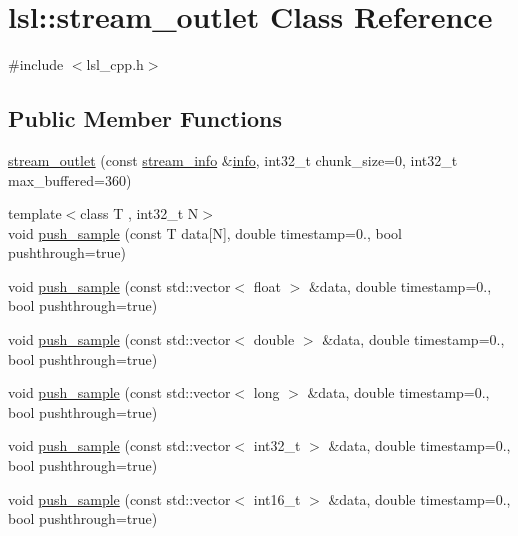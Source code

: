 \hypertarget{classlsl_1_1stream__outlet}{}\section{lsl\+:\+:stream\+\_\+outlet Class Reference}
\label{classlsl_1_1stream__outlet}


{\ttfamily \#include $<$lsl\+\_\+cpp.\+h$>$}

\subsection*{Public Member Functions}
\begin{DoxyCompactItemize}
\item 
\hyperlink{classlsl_1_1stream__outlet_ac88c568fdc7429d95c51cd7b58d902cc}{stream\+\_\+outlet} (const \hyperlink{classlsl_1_1stream__info}{stream\+\_\+info} \&\hyperlink{classlsl_1_1stream__outlet_af6fda8eb922b27ae3ed98651934243fe}{info}, int32\+\_\+t chunk\+\_\+size=0, int32\+\_\+t max\+\_\+buffered=360)
\item 
{\footnotesize template$<$class T , int32\+\_\+t N$>$ }\\void \hyperlink{classlsl_1_1stream__outlet_a675bbe044a5053087e05e0267fe6722a}{push\+\_\+sample} (const T data\mbox{[}N\mbox{]}, double timestamp=0., bool pushthrough=true)
\item 
void \hyperlink{classlsl_1_1stream__outlet_a4c984d8bf178e2321c590aaf81d4da3f}{push\+\_\+sample} (const std\+::vector$<$ float $>$ \&data, double timestamp=0., bool pushthrough=true)
\item 
void \hyperlink{classlsl_1_1stream__outlet_abd59227041d01d48e90d4d5d05da7662}{push\+\_\+sample} (const std\+::vector$<$ double $>$ \&data, double timestamp=0., bool pushthrough=true)
\item 
void \hyperlink{classlsl_1_1stream__outlet_a277f76e889a33849170d5c25fa99c723}{push\+\_\+sample} (const std\+::vector$<$ long $>$ \&data, double timestamp=0., bool pushthrough=true)
\item 
void \hyperlink{classlsl_1_1stream__outlet_aa1f12739e569d284896c7f514f55a301}{push\+\_\+sample} (const std\+::vector$<$ int32\+\_\+t $>$ \&data, double timestamp=0., bool pushthrough=true)
\item 
void \hyperlink{classlsl_1_1stream__outlet_a66a528d5f31f5b5f747994c6de35a80f}{push\+\_\+sample} (const std\+::vector$<$ int16\+\_\+t $>$ \&data, double timestamp=0., bool pushthrough=true)
\item 

\end{DoxyCompactItemize}
